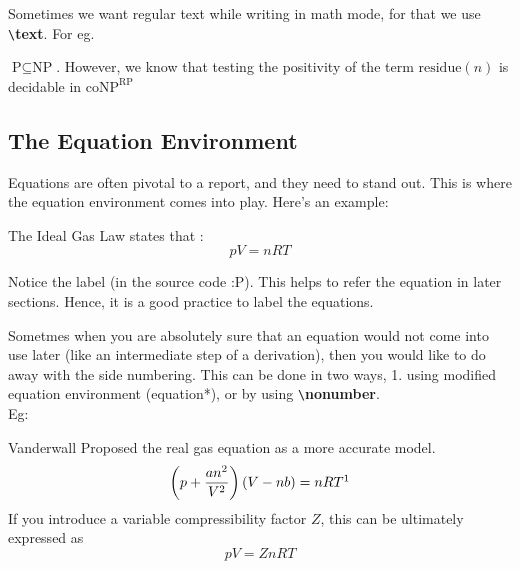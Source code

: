 \documentclass{article}
\theoremstyle{remark}
\begin{document}
    Sometimes we want regular text while writing in math mode, for that we use \verb!\!\textbf{text}.
    For eg. 
    \begin{center}
        $\text{P} \subseteq \text{NP}$. However, we know that testing the positivity of the term
        $\text{residue}(n)$ is decidable in $\text{coNP}^{\text{RP}}$
    \end{center}

    \subsection{The Equation Environment}
    Equations are often pivotal to a report, and they need to stand out. This is where
    the equation environment comes into play. Here's an example: 
    
    \begin{center}
        The Ideal Gas Law states that : 
        \begin{equation}
            pV=nRT
            \label{gaslaw}
        \end{equation}
    \end{center}

    Notice the label (in the source code :P). This helps to refer the equation in later sections.
    Hence, it is a good practice to label the equations.

    Sometmes when you are absolutely sure that an equation would not come into use later (like an intermediate step of a derivation),
    then you would like to do away with the side numbering. This can be done in two ways, 1. using modified equation environment (equation*),
    or by using \verb!\!\textbf{nonumber}. \\ Eg:

    \begin{center}
        Vanderwall Proposed the real gas equation as a more accurate model.
        \begin{equation*}
            \left(p+\frac{an^2}{V^2}\right)(V-nb)=nRT \footnotemark 
        \end{equation*} 
        If you introduce a variable compressibility factor $Z$, this can be ultimately
        expressed as 
        \begin{equation}
            pV=ZnRT \nonumber
        \end{equation}
    \end{center}
\end{document}
